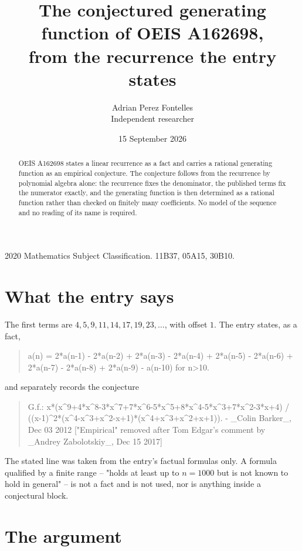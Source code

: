 \documentclass[11pt,a4paper]{article}
\title{The conjectured generating function of OEIS A162698,\\ \large from the recurrence the entry
states}
\author{Adrian Perez Fontelles\\ \small Independent researcher}
\date{15 September 2026}
\theoremstyle{plain}
\theoremstyle{definition}
\begin{document}
\maketitle

\begin{abstract}
OEIS A162698 states a linear recurrence as a fact and carries a rational generating function as an
empirical conjecture. The conjecture follows from the recurrence by polynomial algebra alone:
the recurrence fixes the denominator, the published terms fix the numerator exactly, and the
generating function is then determined as a rational function rather than checked on finitely
many coefficients. No model of the sequence and no reading of its name is required.
\end{abstract}

\noindent\small 2020 Mathematics Subject Classification. 11B37, 05A15, 30B10.\normalsize

\section{What the entry says}

The first terms are $4, 5, 9, 11, 14, 17, 19, 23,\dots$, with offset $1$. The entry states, as a fact,

\begin{quote}\raggedright a(n) = 2*a(n-1) - 2*a(n-2) + 2*a(n-3) - 2*a(n-4) + 2*a(n-5) - 2*a(n-6) + 2*a(n-7) - 2*a(n-8) + 2*a(n-9) - a(n-10) for n>10.\end{quote}

\noindent and separately records the conjecture

\begin{quote}\raggedright G.f.: x*(x\^{}9+4*x\^{}8-3*x\^{}7+7*x\^{}6-5*x\^{}5+8*x\^{}4-5*x\^{}3+7*x\^{}2-3*x+4) / ((x-1)\^{}2*(x\^{}4-x\^{}3+x\^{}2-x+1)*(x\^{}4+x\^{}3+x\^{}2+x+1)). - \_Colin Barker\_, Dec 03 2012 ["Empirical" removed after Tom Edgar's comment by \_Andrey Zabolotskiy\_, Dec 15 2017]\end{quote}

The stated line was taken from the entry's factual formulas only. A formula qualified by a
finite range -- "holds at least up to $n=1000$ but is not known to hold in general" -- is not a
fact and is not used, nor is anything inside a conjectural block.

\section{The argument}
\end{document}
